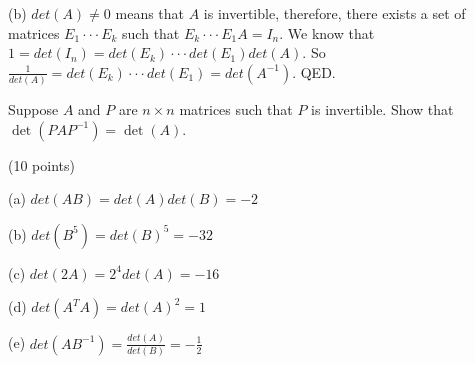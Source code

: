 \documentclass[11pt]{article} %
\begin{document}
(b) $det(A) \neq 0$ means that $A$ is invertible, therefore, there exists a set of matrices $E_1 \cdot\cdot\cdot E_k$ such that $E_k \cdot\cdot\cdot E_1 A = I_n$. We know that $1 = det(I_n) = det(E_k) \cdot \cdot \cdot det(E_1) det(A)$. So $\frac{1}{det(A)} = det(E_k) \cdot \cdot \cdot det(E_1) = det(A^{-1})$. QED.

\medskip
{}
Suppose $A$ and $P$ are $n \times n$ matrices such that 
$P$ is invertible. Show that $\det(PAP^{-1})=\det(A)$.


\medskip
{} (10 points)

(a) $det(AB) = det(A)det(B) = -2$

(b) $det(B^5) = det(B)^5 = -32$

(c) $det(2A) = 2^4det(A) = -16$

(d) $det(A^TA) = det(A)^2 = 1$

(e) $det(AB^{-1}) = \frac{det(A)}{det(B)} = -\frac{1}{2}$
\end{document}
